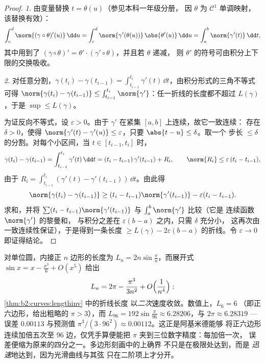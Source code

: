 \begin{proof}
\emph{1.} 由变量替换 $t = \theta(u)$（参见本科一年级分册，
因 $\theta$ 为 $\mathcal{C}^1$ 单调映射，该替换有效）：
\[
\int_c^d \norm{(\gamma\circ\theta)'(u)}\,\dd u
= \int_c^d \norm{\gamma'(\theta(u))}\,\abs{\theta'(u)}\,\dd u
= \int_a^b \norm{\gamma'(t)}\,\dd t ,
\]
其中用到了 $(\gamma\circ\theta)' = \theta'\cdot
(\gamma'\circ\theta)$，并且若 $\theta$ 递减，
则 $\theta'$ 的符号可由积分上下限的交换吸收。

\emph{2.} 对任意分割，$\gamma(t_i) - \gamma(t_{i-1}) =
\int_{t_{i-1}}^{t_i}\gamma'(t)\,\dd t$，由积分形式的三角不等式
可得 $\norm{\gamma(t_i) - \gamma(t_{i-1})}
\leq \int_{t_{i-1}}^{t_i}\norm{\gamma'}$：任一折线的长度都不超过
$L(\gamma)$，于是 $\sup \leq L(\gamma)$。

为证反向不等式，设 $\varepsilon > 0$。由于 $\gamma'$
在紧集 $[a,b]$ 上连续，故它一致连续：
存在 $\delta > 0$，使得 $\norm{\gamma'(t) - \gamma'(u)} \leq
\varepsilon$，只要 $\abs{t - u} \leq \delta$。取一个
步长 $\leq \delta$ 的分割。对每个小区间，当 $t \in [t_{i-1}, t_i]$ 时，
\[
\gamma(t_i) - \gamma(t_{i-1})
= \int_{t_{i-1}}^{t_i}\gamma'(t)\,\dd t
= (t_i - t_{i-1})\,\gamma'(t_{i-1}) + R_i,
\qquad
\norm{R_i} \leq \varepsilon\,(t_i - t_{i-1}),
\]
由于 $R_i = \int_{t_{i-1}}^{t_i}(\gamma'(t) -
\gamma'(t_{i-1}))\,\dd t$。由此得
\[
\norm{\gamma(t_i) - \gamma(t_{i-1})}
\geq (t_i - t_{i-1})\norm{\gamma'(t_{i-1})}
- \varepsilon (t_i - t_{i-1}) .
\]
求和，并将 $\sum (t_i -
t_{i-1})\norm{\gamma'(t_{i-1})}$ 与 $\int_a^b\norm{\gamma'}$ 比较（它是
连续函数 $\norm{\gamma'}$ 的黎曼和，
与积分之差在 $\varepsilon(b - a)$ 之内，只需 $\delta$ 充分小，
这再次由一致连续性保证），于是得到一条长度 $\geq
L(\gamma) - 2\varepsilon(b - a)$ 的折线。令 $\varepsilon \to 0$
即证得结论。
\end{proof}

\begin{example}\label{ex:b2:curves:archimedes}
对单位圆，内接正 $n$ 边形的长度为
$L_n = 2n\sin\frac\pi n$，而展开式 $\sin x = x -
\frac{x^3}6 + O(x^5)$ 给出
\[
L_n = 2\pi - \frac{\pi^3}{3n^2} + O\Bigl(\frac1{n^4}\Bigr) :
\]
\cref{thm:b2:curves:lengthinv} 中的折线长度
以\emph{二次}速度收敛。数值上，$L_6 = 6$
（即正六边形，给出粗略的 $\pi > 3$），而 $L_{96} =
192\sin\frac{\pi}{96} \approx 6.28206$，与 $2\pi \approx
6.28319$ --- 误差 $0.00113$ 与预测值
$\pi^3/(3\cdot96^2) \approx 0.00112$。这正是阿基米德能够
将正六边形连续加倍五次至 $96$ 边，仅凭手算便能把
$\pi$ 夹到三位数字精度：每加倍一次，
误差便缩为原来的四分之一。多边形刻画中的上确界
不只是在极限处达到，而是
\emph{迅速}地达到，因为光滑曲线与其弦
只在二阶项上才分开。
\end{example}

